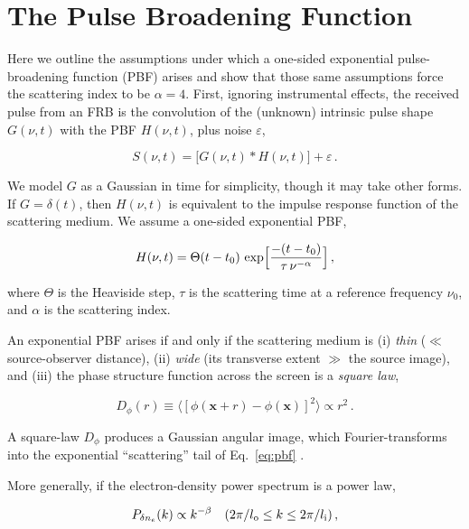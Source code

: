 \documentclass[twocolumn, linenumbers, tra]{aastex631}
\begin{document}
{
\section{The Pulse Broadening Function}\label{apA}

Here we outline the assumptions under which a one-sided exponential pulse-broadening function (PBF) arises and show that those same assumptions force the scattering index to be $\alpha = 4$. First, ignoring instrumental effects, the received pulse from an FRB is the convolution of the (unknown) intrinsic pulse shape $G(\nu,t)$ with the PBF $H(\nu,t)$, plus noise $\varepsilon$,

\begin{equation}\label{eq:pulse}
 S(\nu,t)=\bigl[G(\nu,t)\ast H(\nu,t)\bigr]+\varepsilon\,.
\end{equation}

We model $G$ as a Gaussian in time for simplicity, though it may take other forms. If $G = \delta(t)$, then $H(\nu,t)$ is equivalent to the impulse response function of the scattering medium. We assume a one-sided exponential PBF, 

\begin{equation}\label{eq:pbf}
 H(\nu,t)=\Theta(t-t_0)\,\exp\Bigl[\frac{-(t-t_0)}{\tau\,\nu^{-\alpha}}\Bigr]\,,
\end{equation}

where $\Theta$ is the Heaviside step, $\tau$ is the scattering time at a reference frequency $\nu_0$, and $\alpha$ is the scattering index.

An exponential PBF arises if and only if the scattering medium is (i) \emph{thin} ($\ll$ source-observer distance), (ii) \emph{wide} (its transverse extent $\gg$ the source image), and (iii) the phase structure function across the screen is a \emph{square law}, 

\begin{equation}\label{eq:strfunc}
  D_\phi(r)\equiv\bigl\langle[\phi(\mathbf{x}+r)-\phi(\mathbf{x})]^2\bigr\rangle\propto r^2\,.
\end{equation}

A square-law $D_\phi$ produces a Gaussian angular image, which Fourier-transforms into the exponential ``scattering'' tail of Eq.~\ref{eq:pbf} \citep{Lee1975b}.

More generally, if the electron-density power spectrum is a power law, 

\begin{equation}
  P_{\delta n_e}(k)\propto k^{-\beta}\quad(2\pi/l_{\rm o}\le k\le2\pi/l_{\rm i})\,,
\end{equation}

}
\end{document}
